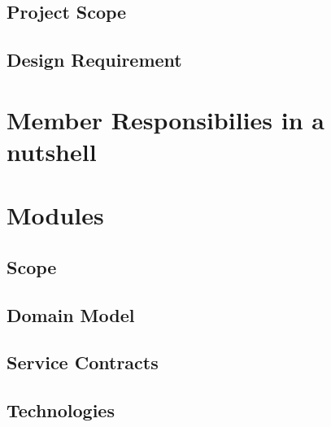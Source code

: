 \documentclass[12pt]{article}
\begin{document}
\paragraph{}

\subsection{Project Scope}
\paragraph{}

\subsection{Design Requirement}
\paragraph{}

\section{Member Responsibilies in a nutshell}
\paragraph{}

\section{Modules}
\paragraph{}

\subsection{Scope}
\paragraph{}

\subsection{Domain Model}
\paragraph{}

\subsection{Service Contracts}
\paragraph{}
	 	 
\subsection{Technologies}
\paragraph{}
\end{document}
